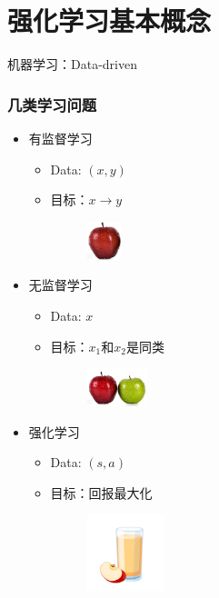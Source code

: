 \documentclass[8pt]{beamer}
\begin{document}
\section{强化学习基本概念}
\begin{frame}

机器学习：Data-driven

\vspace{1em}

\frametitle{几类学习问题}
\begin{itemize}
\item 有监督学习
\begin{itemize}
\item Data: $(x,y)$
\item 目标：$x\rightarrow y$
\begin{figure}
\includegraphics[height=3em]{../fig/apple1.png}

\end{figure}
\end{itemize}

\item 无监督学习
\begin{itemize}
\item Data: $x$
\item 目标：$x_1$和$x_2$是同类
\begin{figure}
\includegraphics[height=3em]{../fig/apple2.png}

\end{figure}
\end{itemize}

\item 强化学习
\begin{itemize}
\item Data: $(s,a)$
\item 目标：回报最大化
\begin{figure}
\includegraphics[height=6em]{../fig/apple3.png}

\end{figure}
\end{itemize}


\end{itemize}

\end{frame}
\end{document}
